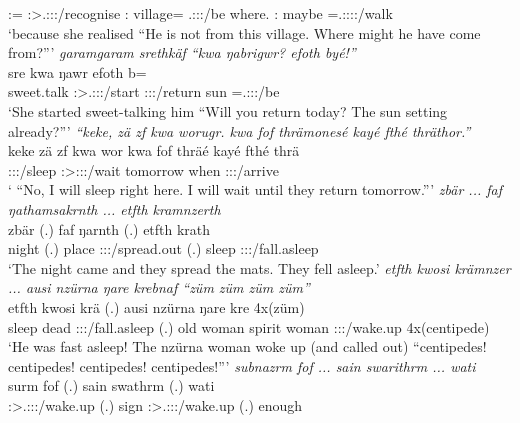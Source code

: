 \begin{exe}
	\Dem:\Med={\Char} \Stsg:\Sbj>\Tsg.\Masc:\Obj:\Pst:\Ipfv/recognise {\Quot} \Dem:{\Prox} village={\Char} {\Neg} \Tsg.\Masc:\Sbj:\Nonpast:\Ipfv/be where.{\Abl} \Dem:{\Prox} maybe  \Immpst=\Tsg.\Masc:\Sbj:\Nonpast:\Ipfv:\Venit/walk\\
	\trans `because she realised ``He is not from this village. Where might he have come from?'''
	\emph{garamgaram srethkäf ``kwa ŋabrigwr? efoth byé!''}\\
	 sre kwa ŋawr efoth b=\\
	{sweet.talk} \Stsg:\Sbj>\Tsg.\Masc:\Obj:\Irr:\Pfv/start {\Fut} \Stsg:\Sbj:\Nonpast:\Ipfv/return sun \Med=\Tsg.\Masc:\Sbj:\Nonpast:\Ipfv/be\\
	\trans `She started sweet-talking him ``Will you return today? The sun setting already?'''
	\emph{``keke, zä zf kwa worugr. kwa fof thrämonesé kayé fthé thräthor.''}\\
	\gll keke zä zf kwa wor kwa fof thräé kayé fthé thrä\\
	{\Neg} {\Prox} {\Imm} {\Fut} \Fsg:\Sbj:\Nonpast:\Ipfv/sleep {\Fut} {\Emph} \Fsg:\Sbj>\Stpl:\Obj:\Irr:\Pfv/wait tomorrow when \Stpl:\Sbj:\Irr:\Pfv/arrive\\
	\trans ` ``No, I will sleep right here. I will wait until they return tomorrow.'''
	\emph{zbär ... faf ŋathamsakrnth ... etfth kramnzerth}\\
	\gll zbär (.) faf ŋarnth (.) etfth krath\\
	night (.) place \Stdu:\Sbj:\Nonpast:\Ipfv/spread.out (.) sleep \Stdu:\Sbj:\Irr:\Pfv/fall.asleep\\
	\trans `The night came and they spread the mats. They fell asleep.'
	\emph{etfth kwosi krämnzer ... ausi nzürna ŋare krebnaf ``züm züm züm züm''}\\
	\gll etfth kwosi krä (.) ausi nzürna ŋare kre 4x(züm)\\
	sleep dead \Stsg:\Sbj:\Irr:\Pfv/fall.asleep (.) {old woman} spirit woman \Stsg:\Sbj:\Irr:\Pfv/wake.up 4x(centipede)\\
	\trans `He was fast asleep! The nzürna woman woke up (and called out) ``centipedes! centipedes! centipedes! centipedes!'''
	\emph{subnazrm fof ... sain swarithrm ... wati}\\
	\gll surm fof (.) sain swathrm (.) wati\\
	\Sg:\Sbj>\Tsg.\Masc:\Obj:\Pst:\Dur/wake.up {\Emph} (.) sign \Sg:\Sbj>\Tsg.\Masc:\Io:\Pst:\Dur/wake.up (.) enough\\

\end{exe}
